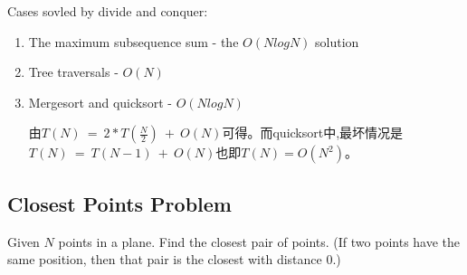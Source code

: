 \documentclass{article}
\begin{document}
Cases sovled by divide and conquer:
\begin{enumerate}
    \item The maximum subsequence sum - the $O(N log N)$ solution
    \item Tree traversals - $O(N)$
    \item Mergesort and quicksort - $O(N log N)$\par
    由$T(N) \ = \ 2*T(\frac{N}{2}) \ + \ O(N)$可得。而quicksort中,最坏情况是$T(N) \ = \ T(N-1) \ + \ O(N)$也即$T(N) = O(N^2)$。
\end{enumerate}

\subsection{Closest Points Problem}
Given $N$ points in a plane. Find the closest pair of points. (If two points have the same position, then that pair is the closest with distance 0.)
\end{document}
